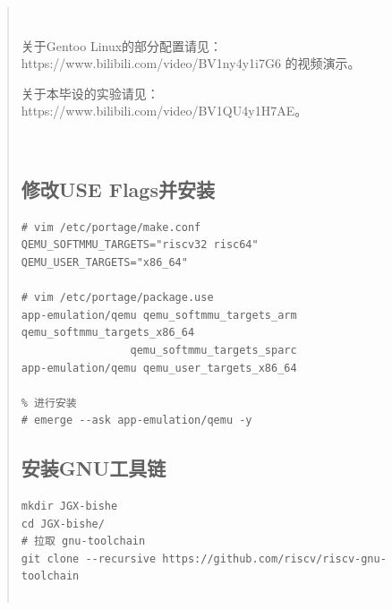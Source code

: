 

\renewcommand\thesection{附录\Alph{subsubsection}}

\newpage
\renewcommand{\abstractname}{\heiti{\zihao{-2} {附\quad \quad \quad \quad 录}}}
\begin{abstract}
{}    

~\\
\begin{center}
\end{center}
{}    
\setlength{\baselineskip}{20pt} %
\begin{sloppypar} %
{ {
    关于Gentoo Linux的部分配置请见：https://www.bilibili.com/video/BV1ny4y1i7G6 的视频演示。

    关于本毕设的实验请见：https://www.bilibili.com/video/BV1QU4y1H7AE。
    
}}

~\\
\begin{center}
\end{center}
{}   
\subsection*{修改USE Flags并安装}
\begin{lstlisting}
# vim /etc/portage/make.conf
QEMU_SOFTMMU_TARGETS="riscv32 risc64"
QEMU_USER_TARGETS="x86_64"

# vim /etc/portage/package.use
app-emulation/qemu qemu_softmmu_targets_arm qemu_softmmu_targets_x86_64
                 qemu_softmmu_targets_sparc
app-emulation/qemu qemu_user_targets_x86_64

% 进行安装
# emerge --ask app-emulation/qemu -y
\end{lstlisting}


\subsection*{安装GNU工具链}
\begin{lstlisting}
mkdir JGX-bishe
cd JGX-bishe/
# 拉取 gnu-toolchain
git clone --recursive https://github.com/riscv/riscv-gnu-toolchain


\end{lstlisting}
\end{sloppypar}
\end{abstract}
